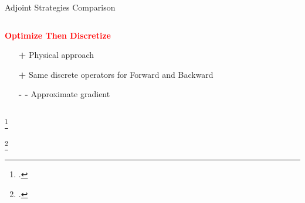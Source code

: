 \begin{frame}{Adjoint Strategies Comparison}
  \begin{columns}
    \begin{column}[t]{0.5\textwidth}
      \textbf{\textcolor{red}{Optimize Then Discretize}}
      \vspace{0.5cm}
      \begin{itemize}
      \item[\textcolor{\mygreen}{\textbf{+}}] Physical approach
      \item[\textcolor{\mygreen}{\textbf{+}}] Same discrete operators for Forward and Backward
      \item[\textbf{- -}] Approximate gradient \footnotemark
      \end{itemize}
      \vspace{0.5cm}
    \end{column}\vrule \hfill
    \begin{column}[t]{0.5\textwidth}
    \end{column}
  \end{columns}
  \addtocounter{footnote}{-1}
  \footcitetext{gunzburger2002perspectives}
  \addtocounter{footnote}{+1}
  \footcitetext{sei1995note}
\end{frame}





